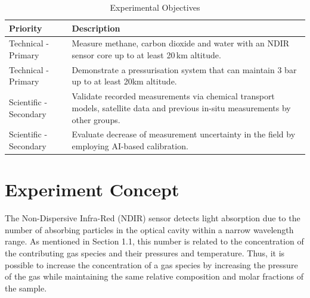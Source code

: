 \documentclass[ %
  a4paper, %
  11pt, %
  openany, %
  parskip, %
  toc=totoc, %
  listof=totoc, %
  bibliography=totoc %
]{scrreprt} %
\providecommand{\DIFaddbeginFL}{} %
\providecommand{\DIFaddendFL}{} %
\providecommand{\DIFdelbeginFL}{} %
\providecommand{\DIFdelendFL}{} %
\providecommand{\DIFscaledelfig}{0.5}
\newlength{\DIFdelgraphicswidth} %
\newlength{\DIFdelgraphicsheight} %
\providecommand{\DIFaddincludegraphics}[2][]{{\color{blue}\fbox{\DIFOincludegraphics[#1]{#2}}}} %
\providecommand{\DIFdelincludegraphics}[2][]{%
\sbox{\DIFdelgraphicsbox}{\DIFOincludegraphics[#1]{#2}}%
\settoboxwidth{\DIFdelgraphicswidth}{\DIFdelgraphicsbox} %
\settoboxtotalheight{\DIFdelgraphicsheight}{\DIFdelgraphicsbox} %
\scalebox{\DIFscaledelfig}{%
\parbox[b]{\DIFdelgraphicswidth}{\usebox{\DIFdelgraphicsbox}\\[-\baselineskip] \rule{\DIFdelgraphicswidth}{0em}}\llap{\resizebox{\DIFdelgraphicswidth}{\DIFdelgraphicsheight}{%
\setlength{\unitlength}{\DIFdelgraphicswidth}%
\begin{picture}(1,1)%
\thicklines\linethickness{2pt} %
{\color[rgb]{1,0,0}\put(0,0){\framebox(1,1){}}}%
{\color[rgb]{1,0,0}\put(0,0){\line( 1,1){1}}}%
{\color[rgb]{1,0,0}\put(0,1){\line(1,-1){1}}}%
\end{picture}%
}\hspace*{3pt}}} %
} %
\DeclareRobustCommand{\DIFaddbeginFL}{\DIFOaddbeginFL \let\includegraphics\DIFaddincludegraphics} %
\DeclareRobustCommand{\DIFaddendFL}{\DIFOaddendFL \let\includegraphics\DIFOincludegraphics} %
\DeclareRobustCommand{\DIFdelbeginFL}{\DIFOdelbeginFL \let\includegraphics\DIFdelincludegraphics} %
\DeclareRobustCommand{\DIFdelendFL}{\DIFOaddendFL \let\includegraphics\DIFOincludegraphics} %
\begin{document}
\begin{table}[H]
\centering
\caption{Experimental Objectives}
\label{tab:objectives}
\DIFdelbeginFL %
\DIFdelendFL \DIFaddbeginFL \begin{tabularx}{0.9\textwidth}{lX}
\toprule
\textbf{Priority} & \textbf{Description} \\
\midrule
Technical - Primary & Measure methane, carbon dioxide and water with an NDIR sensor core up to at least 20\,km altitude.\\
Technical - Primary & Demonstrate a pressurisation system that can maintain 3 bar up to at least 20km altitude.\\
Scientific - Secondary & Validate recorded measurements via chemical transport models, satellite data and previous in-situ measurements by other groups.\\
Scientific - Secondary & Evaluate decrease of measurement uncertainty in the field by employing AI-based calibration.\\
\bottomrule
\end{tabularx}\DIFaddendFL 
\end{table}

\section{Experiment Concept}

The Non-Dispersive Infra-Red (NDIR) sensor detects light absorption due to the number of absorbing particles in the optical cavity within a narrow wavelength range.
As mentioned in Section 1.1, this number is related to the concentration of the contributing gas species and their pressures and temperature.
Thus, it is possible to increase the concentration of a gas species by increasing the pressure of the gas while maintaining the same relative composition and molar fractions of the sample.
\end{document}
